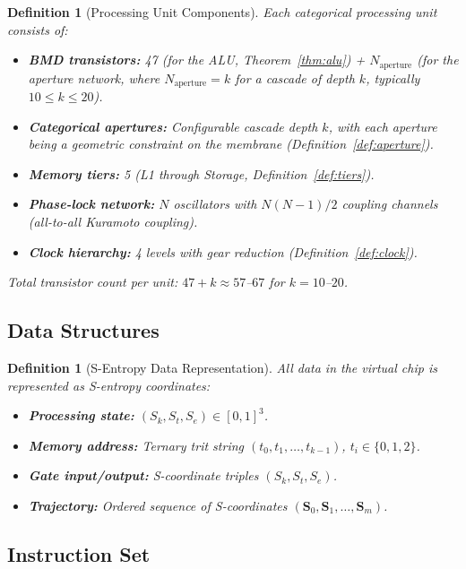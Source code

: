 \documentclass[twocolumn,10pt]{article}
\newtheorem{definition}[theorem]{Definition}
\theoremstyle{remark}
\newcommand{\Sk}{S_k}
\newcommand{\St}{S_t}
\newcommand{\Se}{S_e}
\newcommand{\Scoord}{\mathbf{S}}
\begin{document}
\begin{definition}[Processing Unit Components]
\label{def:components}
Each categorical processing unit consists of:
\begin{itemize}
\item \textbf{BMD transistors:} 47 (for the ALU, Theorem~\ref{thm:alu}) + $N_{\mathrm{aperture}}$ (for the aperture network, where $N_{\mathrm{aperture}} = k$ for a cascade of depth $k$, typically $10 \leq k \leq 20$).
\item \textbf{Categorical apertures:} Configurable cascade depth $k$, with each aperture being a geometric constraint on the membrane (Definition~\ref{def:aperture}).
\item \textbf{Memory tiers:} 5 (L1 through Storage, Definition~\ref{def:tiers}).
\item \textbf{Phase-lock network:} $N$ oscillators with $N(N-1)/2$ coupling channels (all-to-all Kuramoto coupling).
\item \textbf{Clock hierarchy:} 4 levels with gear reduction (Definition~\ref{def:clock}).
\end{itemize}
Total transistor count per unit: $47 + k \approx 57$--$67$ for $k = 10$--$20$.
\end{definition}

\subsection{Data Structures}

\begin{definition}[S-Entropy Data Representation]
\label{def:data}
All data in the virtual chip is represented as S-entropy coordinates:
\begin{itemize}
\item \textbf{Processing state:} $(\Sk, \St, \Se) \in [0,1]^3$.
\item \textbf{Memory address:} Ternary trit string $(t_0, t_1, \ldots, t_{k-1})$, $t_i \in \{0, 1, 2\}$.
\item \textbf{Gate input/output:} S-coordinate triples $(\Sk, \St, \Se)$.
\item \textbf{Trajectory:} Ordered sequence of S-coordinates $(\Scoord_0, \Scoord_1, \ldots, \Scoord_m)$.
\end{itemize}
\end{definition}

\subsection{Instruction Set}
\end{document}
